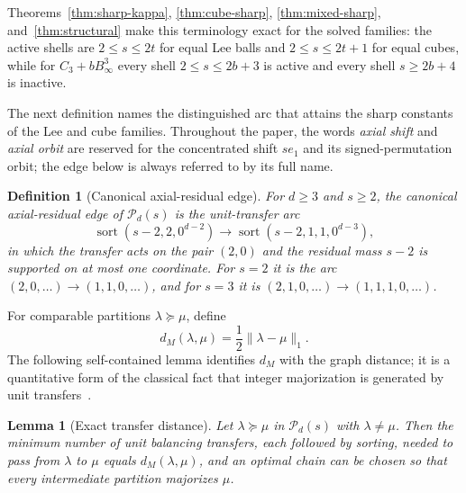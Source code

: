 \documentclass[pdflatex,sn-mathphys-num]{sn-jnl}
\theoremstyle{thmstyleone}
\newtheorem{lemma}[theorem]{Lemma}
\theoremstyle{thmstylethree}
\newtheorem{definition}[theorem]{Definition}
\theoremstyle{thmstyletwo}
\begin{document}
Theorems~\ref{thm:sharp-kappa}, \ref{thm:cube-sharp},
\ref{thm:mixed-sharp}, and~\ref{thm:structural} make this terminology exact
for the solved families: the active shells are $2\le s\le2t$ for equal Lee
balls and $2\le s\le2t+1$ for equal cubes, while for $C_3+bB_\infty^3$ every
shell $2\le s\le2b+3$ is active and every shell $s\ge2b+4$ is inactive.

The next definition names the distinguished arc that attains the sharp
constants of the Lee and cube families.  Throughout the paper, the words
\emph{axial shift} and \emph{axial orbit} are reserved for the concentrated
shift $se_1$ and its signed-permutation orbit; the edge below is always
referred to by its full name.

\begin{definition}[Canonical axial-residual edge]
\label{def:axial-edge}
For $d\ge3$ and $s\ge2$, the \emph{canonical axial-residual edge} of
$\mathcal P_d(s)$ is the unit-transfer arc
\[
 \operatorname{sort}(s-2,2,0^{d-2})
 \longrightarrow
 \operatorname{sort}(s-2,1,1,0^{d-3}),
\]
in which the transfer acts on the pair $(2,0)$ and the residual mass $s-2$
is supported on at most one coordinate.  For $s=2$ it is the arc
$(2,0,\ldots)\to(1,1,0,\ldots)$, and for $s=3$ it is
$(2,1,0,\ldots)\to(1,1,1,0,\ldots)$.
\end{definition}

For comparable partitions $\lambda\succeq\mu$, define
\begin{equation}
 d_M(\lambda,\mu)
 =\frac12\|\lambda-\mu\|_1.                         \label{eq:maj-distance}
\end{equation}
The following self-contained lemma identifies $d_M$ with the graph distance;
it is a quantitative form of the classical fact that integer majorization is
generated by unit transfers~\cite{MarshallOlkinArnold11}.

\begin{lemma}[Exact transfer distance]
\label{lem:transfer-distance}
Let $\lambda\succeq\mu$ in $\mathcal P_d(s)$ with $\lambda\ne\mu$.  Then the
minimum number of unit balancing transfers, each followed by sorting, needed
to pass from $\lambda$ to $\mu$ equals $d_M(\lambda,\mu)$, and an optimal
chain can be chosen so that every intermediate partition majorizes $\mu$.
\end{lemma}
\end{document}
